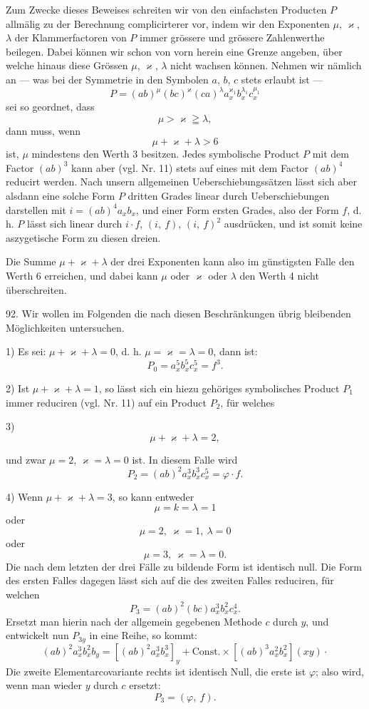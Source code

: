 Zum Zwecke dieses Beweises schreiten wir von den einfachsten Producten $P$ allmälig zu der Berechnung complicirterer vor, indem wir den Exponenten $\mu$, $\varkappa$, $\lambda$ der Klammerfactoren von $P$ immer grössere und grössere Zahlenwerthe beilegen. Dabei können wir schon von vorn herein eine Grenze angeben, über welche hinaus diese Grössen $\mu$, $\varkappa$, $\lambda$ nicht wachsen können. Nehmen wir nämlich an --- was bei der Symmetrie in den Symbolen $a$, $b$, $c$ stets erlaubt ist ---
\[
P = (ab)^\mu (bc)^\varkappa (ca)^\lambda a_x^{\varkappa_1} b_x^{\lambda_1} c_x^{\mu_1}
\]
sei so geordnet, dass
\[
\mu > \varkappa \geqq \lambda,
\]
dann muss, wenn
\[
\mu + \varkappa + \lambda > 6
\]
ist, $\mu$ mindestens den Werth 3 besitzen. Jedes symbolische Product $P$ mit dem Factor $(ab)^3$ kann aber (vgl. Nr. 11) stets auf eines mit dem Factor $(ab)^4$ reducirt werden. Nach unsern allgemeinen Ueberschiebungssätzen lässt sich aber alsdann eine solche Form $P$ dritten Grades linear durch Ueberschiebungen darstellen mit $i = (ab)^4 a_x b_x$, und einer Form ersten Grades, also der Form $f$, d. h. $P$ lässt sich linear durch $i\cdot f$, $(i,\ f)$, $(i,\ f)^2$ ausdrücken, und ist somit keine aszygetische Form zu diesen dreien.

Die Summe $\mu + \varkappa + \lambda$ der drei Exponenten kann also im günstigsten Falle den Werth 6 erreichen, und dabei kann $\mu$ oder $\varkappa$ oder $\lambda$ den Werth 4 nicht überschreiten.

92. Wir wollen im Folgenden die nach diesen Beschränkungen übrig bleibenden Möglichkeiten untersuchen.

1) Es sei: $\mu + \varkappa + \lambda = 0$, d. h. $\mu = \varkappa = \lambda = 0$, dann ist:
\[
P_0 = a_x^5 b_x^5 c_x^5 = f^3.
\]

2) Ist $\mu + \varkappa + \lambda = 1$, so lässt sich ein hiezu gehöriges symbolisches Product $P_1$ immer reduciren (vgl. Nr. 11) auf ein Product $P_2$, für welches

3)
\[
\mu + \varkappa + \lambda = 2,
\]


und zwar $\mu = 2$, $\varkappa = \lambda = 0$ ist. In diesem Falle wird
\[
P_2 = (ab)^2 a_x^3 b_x^3 c_x^5 = \varphi \cdot f.
\]

4) Wenn $\mu + \varkappa + \lambda = 3$, so kann entweder
\[
\mu = k = \lambda = 1 %
\]
oder
\[
\mu = 2,\ \varkappa = 1,\ \lambda = 0
\]
oder
\[
\mu = 3,\ \varkappa = \lambda = 0.
\]
Die nach dem letzten der drei Fälle zu bildende Form ist identisch null. Die Form des ersten Falles dagegen lässt sich auf die des zweiten Falles reduciren, für welchen
\[
P_3 = (ab)^2 (bc) a_x^3 b_x^2 c_x^4.
\]
Ersetzt man hierin nach der allgemein gegebenen Methode $c$ durch $y$, und entwickelt nun $P_{3y}$ in eine Reihe, so kommt:
\[
(ab)^2 a_x^3 b_x^2 b_y = [(ab)^2 a_x^3 b_x^3]_y + \text{Const.} \times [(ab)^3 a_x^2 b_x^2] (xy) \cdot
\]
Die zweite Elementarcovariante rechts ist identisch Null, die erste ist $\varphi$; also wird, wenn man wieder $y$ durch $c$ ersetzt:
\[
P_3 = (\varphi,\ f).
\]

